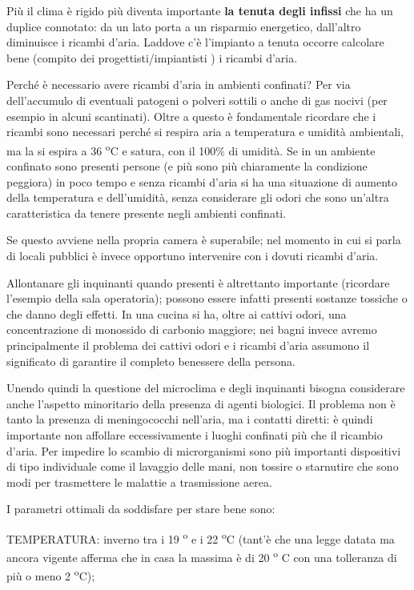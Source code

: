 Più il clima è rigido più diventa importante \textbf{la tenuta degli
infissi} che ha un duplice connotato: da un lato porta a un risparmio
energetico, dall'altro diminuisce i ricambi d'aria. Laddove c'è
l'impianto a tenuta occorre calcolare bene (compito dei
progettisti/impiantisti ) i ricambi d'aria.

Perché è necessario avere ricambi d'aria in ambienti confinati? Per via
dell'accumulo di eventuali patogeni o polveri sottili o anche di gas
nocivi (per esempio in alcuni scantinati). Oltre a questo è fondamentale
ricordare che i ricambi sono necessari perché si respira aria a
temperatura e umidità ambientali, ma la si espira a 36 \textsuperscript{o}C e satura, con
il 100\% di umidità. Se in un ambiente confinato sono presenti persone
(e più sono più chiaramente la condizione peggiora) in poco tempo e
senza ricambi d'aria si ha una situazione di aumento della temperatura e
dell'umidità, senza considerare gli odori che sono un'altra
caratteristica da tenere presente negli ambienti confinati.

Se questo avviene nella propria camera è superabile; nel momento in cui
si parla di locali pubblici è invece opportuno intervenire con i dovuti
ricambi d'aria.

Allontanare gli inquinanti quando presenti è altrettanto importante
(ricordare l'esempio della sala operatoria); possono essere infatti
presenti sostanze tossiche o che danno degli effetti. In una cucina si
ha, oltre ai cattivi odori, una concentrazione di monossido di carbonio
maggiore; nei bagni invece avremo principalmente il problema dei cattivi
odori e i ricambi d'aria assumono il significato di garantire il
completo benessere della persona.

Unendo quindi la questione del microclima e degli inquinanti bisogna
considerare anche l'aspetto minoritario della presenza di agenti
biologici. Il problema non è tanto la presenza di meningococchi
nell'aria, ma i contatti diretti: è quindi importante non affollare
eccessivamente i luoghi confinati più che il ricambio d'aria. Per
impedire lo scambio di microrganismi sono più importanti dispositivi di
tipo individuale come il lavaggio delle mani, non tossire o starnutire
che sono modi per trasmettere le malattie a trasmissione aerea.

I parametri ottimali da soddisfare per stare bene sono:

TEMPERATURA: inverno tra i 19 \textsuperscript{o} e i 22 \textsuperscript{o}C (tant'è che una legge datata ma
ancora vigente afferma che in casa la massima è di 20 \textsuperscript{o} C con una
tolleranza di più o meno 2 \textsuperscript{o}C);

